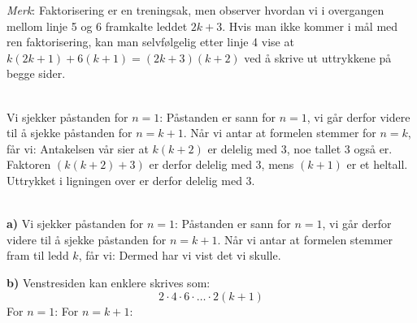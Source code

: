 \textsl{Merk}: Faktorisering er en treningsak, men observer hvordan vi i overgangen mellom linje 5 og 6 framkalte leddet $ 2k+3 $. Hvis man ikke kommer i mål med ren faktorisering, kan man selvfølgelig etter linje 4 vise at $ k(2k+1)+6(k+1)=(2k+3)(k+2) $ ved å skrive ut uttrykkene på begge sider.

 \\
Vi sjekker påstanden for $ {n=1}$:
Påstanden er sann for $ {n=1} $, vi går derfor videre til å sjekke påstanden for $ {n=k+1} $. Når vi antar at formelen stemmer for $ n=k $, får vi:
Antakelsen vår sier at $ k(k+2) $ er delelig med 3, noe tallet 3 også er. Faktoren $ (k(k+2)+3) $ er derfor delelig med 3, mens $ (k+1) $ er et heltall. Uttrykket i ligningen over er derfor delelig med 3.
 
 \\
\textbf{a)} Vi sjekker påstanden for $ {n=1}$:
Påstanden er sann for $ {n=1} $, vi går derfor videre til å sjekke påstanden for $ {n=k+1} $. Når vi antar at formelen stemmer fram til ledd $ k $, får vi:
Dermed har vi vist det vi skulle.

\textbf{b)} Venstresiden kan enklere skrives som:
\[ 2\cdot4\cdot6\cdot\ldots\cdot2(k+1) \]
For $ {n=1} $:
For $ {n=k+1} $:

